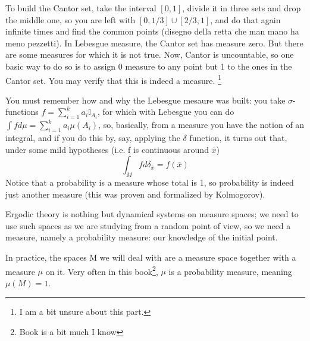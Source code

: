 \begin{example}
    To build the Cantor set, take the interval $[0,1]$, divide it in three sets and drop the middle one, so you are left with $[0, 1/3]\cup[2/3, 1]$, and do that again infinite times and find the common points (disegno della retta che man mano ha meno pezzetti). In Lebesgue measure, the Cantor set has measure zero. But there are some measures for which it is not true. Now, Cantor is uncountable, so one basic way to do so is to assign 0 measure to any point but 1 to the ones in the Cantor set. You may verify that this is indeed a measure. \footnote{I am a bit unsure about this part.} 
\end{example}

You must remember how and why the Lebesgue mesaure was built: you take $\sigma$-functions $f=\sum_{i=1}^{k}a_i\mathbb{I}_{A_i}$, for which with Lebesgue you can do $\int f d\mu=\sum_{i=1}^{k}a_i\mu(A_i)$, so, basically, from a measure you have the notion of an integral, and if you do this by, say, applying the $\delta$ function, it turns out that, under some mild hypotheses (i.e. f is continuous around $\bar{x}$) \begin{equation*}
    \int_M f d\delta_{\bar{x}}=f(\bar{x})
\end{equation*}
Notice that a probability is a measure whose total is 1, so probability is indeed just another measure (this was proven and formalized by Kolmogorov).

Ergodic theory is nothing but dynamical systems on measure spaces; we need to use such spaces as we are studying from a random point of view, so we need a measure, namely a probability measure: our knowledge of the initial point.

In practice, the spaces M we will deal with are a measure space together with a measure $\mu$ on it. Very often in this book\footnote{Book is a bit much I know}, $\mu$ is a probability measure, meaning $\mu(M)=1$. 

